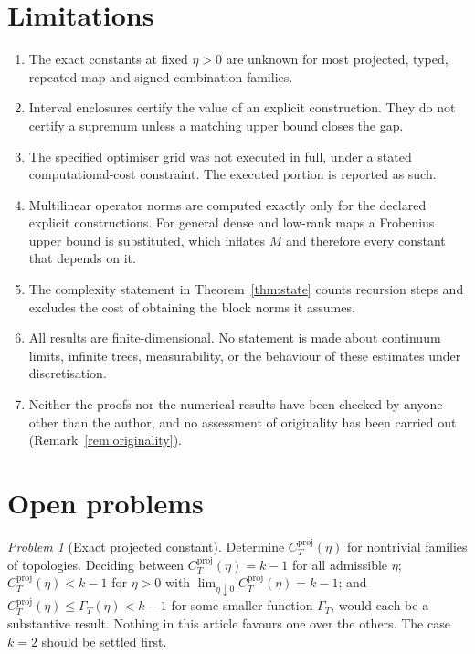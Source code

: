 \documentclass[11pt]{amsart}
\theoremstyle{definition}
\theoremstyle{remark}
\newtheorem{problem}[theorem]{Problem}
\newcommand{\proj}{\mathrm{proj}}
\begin{document}
\begin{table}[p]
\centering\small
\caption{Controls and unresolved items.}
\label{tab:failures}
\resizebox{.94\textwidth}{!}{}
\end{table}

\section{Limitations}
\label{sec:limitations}

\begin{enumerate}[leftmargin=*]
\item The exact constants at fixed $\eta>0$ are unknown for most projected, typed,
repeated-map and signed-combination families.
\item Interval enclosures certify the value of an explicit construction. They do not
certify a supremum unless a matching upper bound closes the gap.
\item The specified optimiser grid was not executed in full, under a stated
computational-cost constraint. The executed portion is reported as such.
\item Multilinear operator norms are computed exactly only for the declared explicit
constructions. For general dense and low-rank maps a Frobenius upper bound is substituted,
which inflates $M$ and therefore every constant that depends on it.
\item The complexity statement in Theorem~\ref{thm:state} counts recursion steps and
excludes the cost of obtaining the block norms it assumes.
\item All results are finite-dimensional. No statement is made about continuum limits,
infinite trees, measurability, or the behaviour of these estimates under discretisation.
\item Neither the proofs nor the numerical results have been checked by anyone other than
the author, and no assessment of originality has been carried out
(Remark~\ref{rem:originality}).
\end{enumerate}

\section{Open problems}
\label{sec:open}

\begin{problem}[Exact projected constant]
\label{prob:constant}
Determine $C_T^{\proj}(\eta)$ for nontrivial families of topologies. Deciding between
$C_T^{\proj}(\eta)=k-1$ for all admissible $\eta$; $C_T^{\proj}(\eta)<k-1$ for $\eta>0$
with $\lim_{\eta\downarrow0}C_T^{\proj}(\eta)=k-1$; and
$C_T^{\proj}(\eta)\le\Gamma_T(\eta)<k-1$ for some smaller function $\Gamma_T$, would each
be a substantive result. Nothing in this article favours one over the others. The case
$k=2$ should be settled first.
\end{problem}
\end{document}
